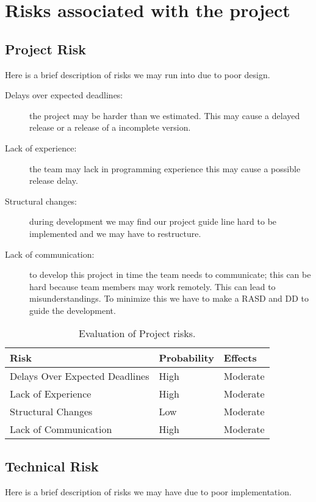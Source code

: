 \section{Risks associated with the project}
  \subsection{Project Risk}
    Here is a brief description of risks we may run into due to poor design.
    \begin{description}
      \item[Delays over expected deadlines:] the project may be harder than we estimated. This may cause a delayed release or a release of a incomplete version.
      \item[Lack of experience:] the team may lack in programming experience this may cause a possible release delay.
      \item[Structural changes:] during development we may find our project guide line hard to be implemented and we may have to restructure.
      \item[Lack of communication:] to develop this project in time the team needs to communicate; this can be hard because team members may work remotely. This can lead to misunderstandings.
          To minimize this we have to make a RASD and DD to guide the development.
    \end{description}

    \begin{table}[h]
    \centering
        \begin{tabular}{| l | l | l |}
            \hline
            \textbf{Risk} & \textbf{Probability} & \textbf{Effects}  \\
            \hline
            Delays Over Expected Deadlines & High & Moderate \\
            \hline
            Lack of Experience & High & Moderate \\
            \hline
            Structural Changes & Low & Moderate \\
            \hline
            Lack of Communication & High & Moderate \\
            \hline
        \end{tabular}
        \caption{Evaluation of Project risks.}
    \end{table}

  \subsection{Technical Risk}
  Here is a brief description of risks we may have due to poor implementation.

